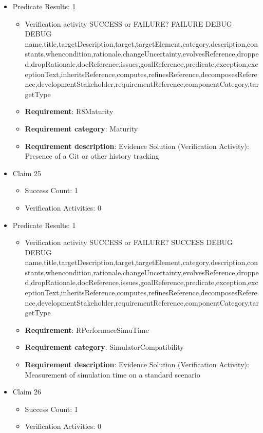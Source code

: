 \documentclass{article}
\begin{document}
\begin{itemize}
									    
				\item Predicate Results: 1
					\begin{itemize}				
					\item Verification activity SUCCESS or FAILURE? FAILURE
					DEBUG DEBUG name,title,targetDescription,target,targetElement,category,description,constants,whencondition,rationale,changeUncertainty,evolvesReference,dropped,dropRationale,docReference,issues,goalReference,predicate,exception,exceptionText,inheritsReference,computes,refinesReference,decomposesReference,developmentStakeholder,requirementReference,componentCategory,targetType
					\item \textbf{Requirement}: R8Maturity 
					\item \textbf{Requirement category}: Maturity
					\item \textbf{Requirement description}: Evidence Solution (Verification Activity): Presence of a Git or other history tracking
					\end{itemize}

  				  \item Claim 25
				\begin{itemize}
			    	\item Success Count: 1 
			    	\item Verification Activities: 0
				\end{itemize}
				
									    
				\item Predicate Results: 1
					\begin{itemize}				
					\item Verification activity SUCCESS or FAILURE? SUCCESS
					DEBUG DEBUG name,title,targetDescription,target,targetElement,category,description,constants,whencondition,rationale,changeUncertainty,evolvesReference,dropped,dropRationale,docReference,issues,goalReference,predicate,exception,exceptionText,inheritsReference,computes,refinesReference,decomposesReference,developmentStakeholder,requirementReference,componentCategory,targetType
					\item \textbf{Requirement}: RPerformaceSimuTime 
					\item \textbf{Requirement category}: SimulatorCompatibility
					\item \textbf{Requirement description}: Evidence Solution (Verification Activity): Measurement of simulation time on a standard scenario
					\end{itemize}

  				  \item Claim 26
				\begin{itemize}
			    	\item Success Count: 1 
			    	\item Verification Activities: 0
				\end{itemize}
				

\end{itemize}
\end{document}
